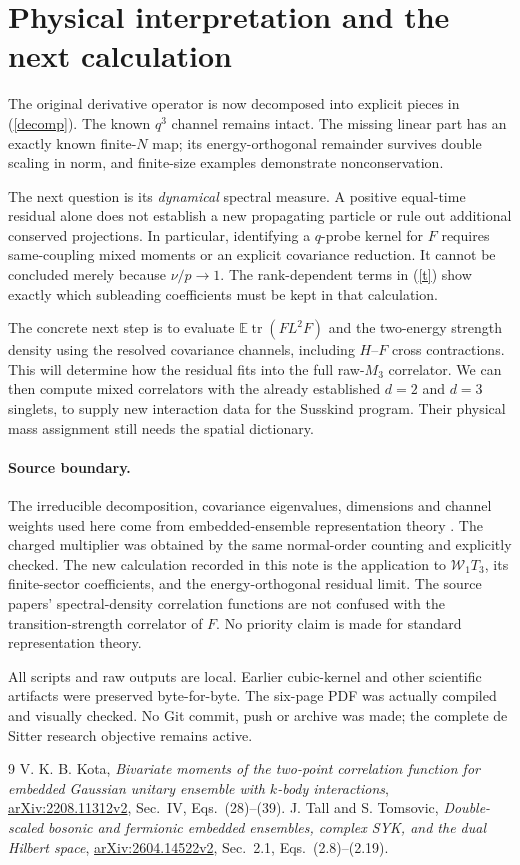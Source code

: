 \documentclass[11pt,a4paper]{article}
\newcommand{\W}{\mathcal W}
\begin{document}
\newpage
\section{Physical interpretation and the next calculation}
The original derivative operator is now decomposed into explicit
pieces in (\ref{decomp}). The known $q^3$ channel remains intact.
The missing linear part has an exactly known finite-$N$ map;
its energy-orthogonal remainder survives double scaling in norm,
and finite-size examples demonstrate nonconservation.

The next question is its \emph{dynamical} spectral measure.
A positive equal-time residual alone does not establish a new
propagating particle or rule out additional conserved projections.
In particular, identifying a $q$-probe kernel for $F$ requires
same-coupling mixed moments or an explicit covariance reduction.
It cannot be concluded merely because $\nu/p\to1$.
The rank-dependent terms in (\ref{t}) show exactly which
subleading coefficients must be kept in that calculation.

The concrete next step is to evaluate
$\mathbb E\operatorname{tr}(F L^2F)$ and the two-energy strength
density using the resolved covariance channels, including
$H$--$F$ cross contractions. This will determine how the residual
fits into the full raw-$M_3$ correlator. We can then compute mixed
correlators with the already established $d=2$ and $d=3$ singlets,
to supply new interaction data for the Susskind program.
Their physical mass assignment still needs the spatial dictionary.

\paragraph{Source boundary.}
The irreducible decomposition, covariance eigenvalues, dimensions
and channel weights used here come from embedded-ensemble
representation theory \cite{Kota,TT}. The charged multiplier
was obtained by the same normal-order counting and explicitly
checked. The new calculation recorded in this note is the
application to $\W_1T_3$, its finite-sector coefficients,
and the energy-orthogonal residual limit.
The source papers' spectral-density correlation functions are
not confused with the transition-strength correlator of $F$.
No priority claim is made for standard representation theory.

All scripts and raw outputs are local. Earlier cubic-kernel
and other scientific artifacts were preserved byte-for-byte.
The six-page PDF was actually compiled and visually checked.
No Git commit, push or archive was made; the complete
de Sitter research objective remains active.

\begin{thebibliography}{9}
V. K. B. Kota,
\emph{Bivariate moments of the two-point correlation function
for embedded Gaussian unitary ensemble with $k$-body interactions},
\href{https://arxiv.org/html/2208.11312}{arXiv:2208.11312v2},
Sec.~IV, Eqs.~(28)--(39).
J. Tall and S. Tomsovic,
\emph{Double-scaled bosonic and fermionic embedded ensembles,
complex SYK, and the dual Hilbert space},
\href{https://arxiv.org/html/2604.14522v2}{arXiv:2604.14522v2},
Sec.~2.1, Eqs.~(2.8)--(2.19).
\end{thebibliography}
\end{document}
